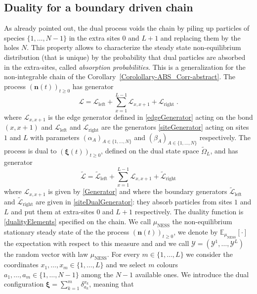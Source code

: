 \documentclass[10pt]{article}
\numberwithin{equation}{section}
\numberwithin{equation}{subsection}
\newcommand{\dt}{\;.}
\begin{document}
\subsection{Duality for a boundary driven chain}\label{Subsection-ss-nonI}
 As already pointed out, the dual process voids the chain by piling up particles of species $\{1,\ldots,N-1\}$ in the extra sites $0$ and $L+1$ and replacing them by the holes $N$. This property allows to characterize the steady state non-equilibrium distribution (that is unique) by the probability that dual particles are absorbed in the extra-sites, called \textit{absorption probabilities}. This is a generalization for the non-integrable chain of the Corollary~\ref{Corolollary-ABS_Corr-abstract}. The process $\left(\bm{n}(t)\right)_{t\geq0}$ has generator
\begin{equation}
	\mathcal{L}=\mathcal{L}_{\text{left}}+\sum_{x=1}^{L-1}\mathcal{L}_{x,x+1}+\mathcal{L}_{\text{right}}\dt
\end{equation} 
where $\mathcal{L}_{x,x+1}$ is the edge generator defined in \eqref{edgeGenerator} acting on the bond $(x,x+1)$ and $\mathcal{L}_{\text{left}}$ and $\mathcal{L}_{\text{right}}$ are the generators \eqref{siteGenerator} acting on sites $1$ and $L$ with parameters $(\alpha_{A})_{A\in \{1,\ldots,N\}}$ and $(\beta_{A})_{A\in \{1,\ldots,N\}}$ respectively. 
The process is dual to $(\bm{\xi}(t))_{t\geq0}$, defined on the dual state space $\widetilde{\Omega}_{L}$, and has generator
\begin{equation}
	\widetilde{\mathcal{L}}=\widetilde{\mathcal{L}}_{\text{left}}+\sum_{x=1}^{L-1}\mathcal{L}_{x,x+1}+\widetilde{\mathcal{L}}_{\text{right}}
\end{equation} 
where $\mathcal{L}_{x,x+1}$ is given by \eqref{Generator} and where the boundary generators $\widetilde{\mathcal{L}}_{\text{left}}$ and $\widetilde{\mathcal{L}}_{\text{right}}$ are given in \eqref{siteDualGenerator}: they absorb particles from sites $1$ and $L$ and put them at extra-sites $0$ and $L+1$ respectively. The duality function is \eqref{dualityElements} specified on the chain. 
We call $\mu_{\text{NESS}}$ the non-equilibrium stationary steady state of the the process $(\bm{n}(t))_{t\geq 0}$, we denote by $\mathbb{E}_{\mu_{\text{NESS}}}[\cdot]$ the expectation with respect to this measure and and we call $\bm{\mathcal{Y}} = (\mathcal{Y}^{1},\ldots,\mathcal{Y}^{L})$ the random vector with law $\mu_{\text{NESS}}$. For every $m\in\{1,\ldots,L\}$ we consider {\color{black}the coordinates $x_{1},\ldots,x_{m}\in\{1,\ldots,L\}$ and we select $m$ colours $a_{1},\ldots,a_{m}\in \{1,\ldots,N-1\}$ among the $N-1$ available ones}. We introduce the dual configuration  $\bm{\xi}=\sum_{k=1}^{m}\delta_{a_{k}}^{x_{k}}$, meaning that 
\end{document}
